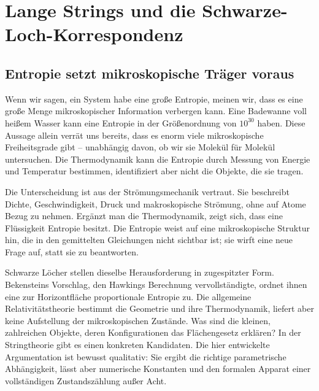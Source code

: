 \chapter{Lange Strings und die Schwarze-Loch-Korrespondenz}


\section{Entropie setzt mikroskopische Träger voraus}

Wenn wir sagen, ein System habe eine große Entropie, meinen wir, dass es eine große Menge mikroskopischer Information verbergen kann. Eine Badewanne voll heißem Wasser kann eine Entropie in der Größenordnung von \(10^{30}\) haben. Diese Aussage allein verrät uns bereits, dass es enorm viele mikroskopische Freiheitsgrade gibt – unabhängig davon, ob wir sie Molekül für Molekül untersuchen. Die Thermodynamik kann die Entropie durch Messung von Energie und Temperatur bestimmen, identifiziert aber nicht die Objekte, die sie tragen.

Die Unterscheidung ist aus der Strömungsmechanik vertraut. Sie beschreibt Dichte, Geschwindigkeit, Druck und makroskopische Strömung, ohne auf Atome Bezug zu nehmen. Ergänzt man die Thermodynamik, zeigt sich, dass eine Flüssigkeit Entropie besitzt. Die Entropie weist auf eine mikroskopische Struktur hin, die in den gemittelten Gleichungen nicht sichtbar ist; sie wirft eine neue Frage auf, statt sie zu beantworten.

Schwarze Löcher stellen dieselbe Herausforderung in zugespitzter Form. Bekensteins Vorschlag, den Hawkings Berechnung vervollständigte, ordnet ihnen eine zur Horizontfläche proportionale Entropie zu. Die allgemeine Relativitätstheorie bestimmt die Geometrie und ihre Thermodynamik, liefert aber keine Aufstellung der mikroskopischen Zustände. Was sind die kleinen, zahlreichen Objekte, deren Konfigurationen das Flächengesetz erklären? In der Stringtheorie gibt es einen konkreten Kandidaten. Die hier entwickelte Argumentation ist bewusst qualitativ: Sie ergibt die richtige parametrische Abhängigkeit, lässt aber numerische Konstanten und den formalen Apparat einer vollständigen Zustandszählung außer Acht.

